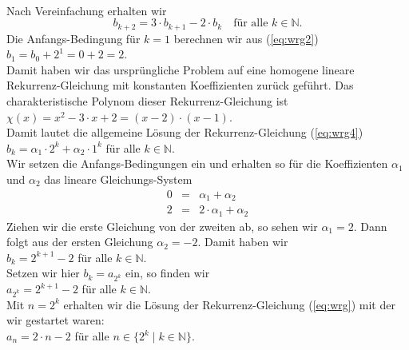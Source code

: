 \\[0.2cm]
Nach Vereinfachung erhalten wir 
\begin{equation}
  \label{eq:wrg4}
  b_{k+2} = 3 \cdot b_{k+1} - 2 \cdot b_k \quad \mbox{f\"{u}r alle $k \in \mathbb{N}$.}
\end{equation}
Die Anfangs-Bedingung f\"{u}r $k=1$ berechnen wir aus (\ref{eq:wrg2}) \\[0.2cm]
\hspace*{1.3cm} $b_1 = b_0 + 2^{1} = 0 + 2 = 2$. \\[0.2cm]
Damit haben wir das urspr\"{u}ngliche Problem auf eine homogene lineare Rekurrenz-Gleichung
mit konstanten Koeffizienten zur\"{u}ck gef\"{u}hrt.  Das charakteristische Polynom dieser
Rekurrenz-Gleichung ist \\[0.2cm]
\hspace*{1.3cm} $\chi(x) = x^2 - 3\cdot x + 2 = (x-2)\cdot(x-1)$. \\[0.2cm]
Damit lautet die allgemeine L\"{o}sung der Rekurrenz-Gleichung (\ref{eq:wrg4}) \\[0.2cm]
\hspace*{1.3cm} $b_k = \alpha_1 \cdot 2^k + \alpha_2 \cdot 1^k$ \quad f\"{u}r alle $k \in \mathbb{N}$. \\[0.2cm]
Wir setzen die Anfangs-Bedingungen ein und erhalten so f\"{u}r die Koeffizienten $\alpha_1$
und $\alpha_2$ das lineare Gleichungs-System 
\[
\begin{array}{lcl}
  0 & = & \alpha_1 + \alpha_2 \\[0.2cm]
  2 & = & 2 \cdot \alpha_1 + \alpha_2 
\end{array}
\]
Ziehen wir die erste Gleichung von der zweiten ab, so sehen wir $\alpha_1 = 2$.  Dann
folgt aus der ersten Gleichung $\alpha_2 = -2$.  Damit haben wir \\[0.2cm]
\hspace*{1.3cm} $b_k = 2^{k+1} - 2$ \quad f\"{u}r alle $k \in \mathbb{N}$. \\[0.2cm]
Setzen wir hier $b_k = a_{2^k}$ ein, so finden wir \\[0.2cm]
\hspace*{1.3cm} $a_{2^k} = 2^{k+1} - 2$ \quad f\"{u}r alle $k \in \mathbb{N}$. \\[0.2cm]
Mit $n = 2^k$ erhalten wir die L\"{o}sung der Rekurrenz-Gleichung (\ref{eq:wrg}) mit der wir 
gestartet waren: \\[0.2cm]
\hspace*{1.3cm} $a_n = 2 \cdot n - 2$ \quad f\"{u}r alle $n \in \{ 2^k \mid k \in \mathbb{N}\}$.  
\vspace*{0.3cm}

